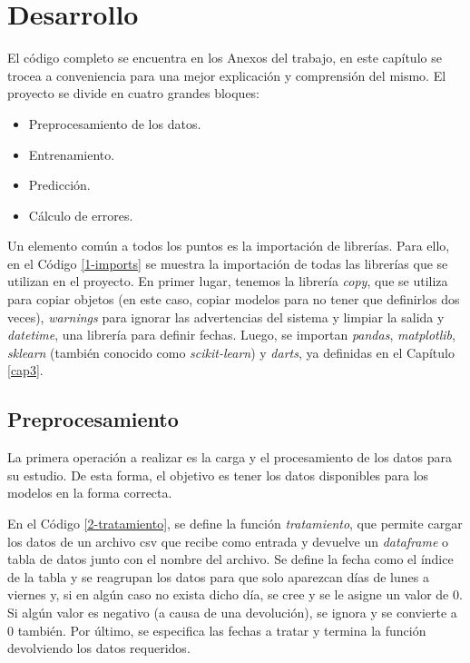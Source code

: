 \chapter{Desarrollo}\label{cap4}

El código completo se encuentra en los Anexos del trabajo, en este capítulo se trocea a conveniencia para una mejor explicación y comprensión del mismo. El proyecto se divide en cuatro grandes bloques:

\begin{itemize}
    \item Preprocesamiento de los datos.
    \item Entrenamiento.
    \item Predicción.
    \item Cálculo de errores.
\end{itemize}

Un elemento común a todos los puntos es la importación de librerías. Para ello, en el Código \ref*{1-imports} se muestra la importación de todas las librerías que se utilizan en el proyecto. En primer lugar, tenemos la librería \textit{copy}, que se utiliza para copiar objetos (en este caso, copiar modelos para no tener que definirlos dos veces), \textit{warnings} para ignorar las advertencias del sistema y limpiar la salida y \textit{datetime}, una librería para definir fechas. Luego, se importan \textit{pandas}, \textit{matplotlib}, \textit{sklearn} (también conocido como \textit{scikit-learn}) y \textit{darts}, ya definidas en el Capítulo \ref{cap3}.



\section{Preprocesamiento}

La primera operación a realizar es la carga y el procesamiento de los datos para su estudio. De esta forma, el objetivo es tener los datos disponibles para los modelos en la forma correcta.

En el Código \ref*{2-tratamiento}, se define la función \textit{tratamiento}, que permite cargar los datos de un archivo csv que recibe como entrada y devuelve un \textit{dataframe} o tabla de datos junto con el nombre del archivo. Se define la fecha como el índice de la tabla y se reagrupan los datos para que solo aparezcan días de lunes a viernes y, si en algún caso no exista dicho día, se cree y se le asigne un valor de 0. Si algún valor es negativo (a causa de una devolución), se ignora y se convierte a 0 también. Por último, se especifica las fechas a tratar y termina la función devolviendo los datos requeridos.

